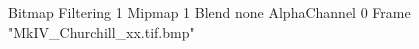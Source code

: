 {Bitmap
	{Filtering 1}
	{Mipmap 1}
	{Blend none}
	{AlphaChannel 0}
	{Frame "MkIV_Churchill_xx.tif.bmp"}
}
